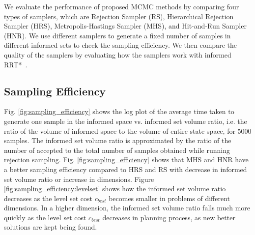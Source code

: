 \documentclass[letterpaper, 10 pt, conference]{ieeeconf}  %
\begin{document}
We evaluate the performance of proposed MCMC methods by comparing four types of samplers, which are Rejection Sampler (RS), Hierarchical Rejection Sampler (HRS), Metropolis-Hastings Sampler (MHS), and Hit-and-Run Sampler (HNR).
We use different samplers to generate a fixed number of samples in different informed sets to check the sampling efficiency. %
We then compare the quality of the samplers by evaluating how the samplers work with informed RRT*~\cite{GSB14}.

\subsection{Sampling Efficiency}


Fig. \ref{fig:sampling_efficiency} shows the log plot of the average time taken to generate one sample in the informed space vs. informed set volume ratio, i.e. the ratio of the volume of informed space to the volume of entire state space, for 5000 samples. 
The informed set volume ratio is approximated by the ratio of the number of accepted to the total number of samples obtained while running rejection sampling. 
Fig. \ref{fig:sampling_efficiency} shows that MHS and HNR have a better sampling efficiency compared to HRS and RS with decrease in informed set volume ratio or increase in dimensions. 
Figure \ref{fig:sampling_efficiency:levelset} shows how the informed set volume ratio decreases as the level set cost $ c_{best} $ becomes smaller in problems of different dimensions.
In a higher dimension, the informed set volume ratio falls much more quickly as the level set cost $ c_{best} $ decreases in planning process, as new better solutions are kept being found.
\end{document}
